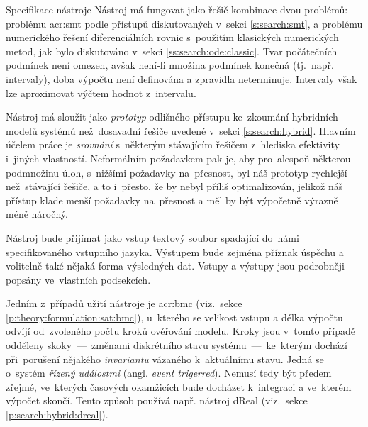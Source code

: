 \documentclass[thesis=M,czech]{FITthesis}[2012/06/26]
\newcommand{\acrlabel}[1]{acr:#1}
\newcommand{\acr}[1]{\acrshort{\acrlabel{#1}}}
\newcommand{\hl}[1]{\textit{#1}}
\newcommand{\name}[1]{\hl{#1}}
\newcommand{\rf}[1]{\ref{#1}}
\begin{document}

\begin{section}{Specifikace nástroje}\label{s:design:spec}
Nástroj má fungovat jako řešič kombinace
dvou problémů: problému \acr{smt}
podle přístupů diskutovaných v~sekci \rf{s:search:smt},
a problému numerického řešení diferenciálních rovnic
s~použitím klasických numerických metod,
jak bylo diskutováno v~sekci \rf{ss:search:ode:classic}.
Tvar počátečních podmínek není omezen,
avšak není-li množina podmínek konečná
(tj.~např. intervaly),
doba výpočtu není definována a zpravidla neterminuje.
Intervaly však lze aproximovat výčtem hodnot z~intervalu.

Nástroj má sloužit jako \hl{prototyp}
odlišného přístupu ke~zkoumání hybridních modelů systémů
než~dosavadní řešiče
uvedené v~sekci \rf{s:search:hybrid}.
Hlavním účelem práce je \hl{srovnání}
s~některým stávajícím řešičem
z~hlediska efektivity
i~jiných vlastností.
Neformálním požadavkem pak je,
aby pro~alespoň některou podmnožinu
úloh, s~nižšími požadavky na~přesnost, byl náš prototyp
rychlejší než~stávající řešiče,
a to i~přesto, že by nebyl příliš optimalizován,
jelikož náš přístup
klade menší požadavky na~přesnost
a měl by být výpočetně výrazně méně náročný.

Nástroj bude přijímat jako vstup textový soubor
spadající do~námi specifikovaného vstupního jazyka.
Výstupem bude zejména příznak úspěchu
a volitelně také nějaká forma výsledných dat.
Vstupy a výstupy jsou podrobněji popsány ve~vlastních podsekcích.

Jedním z~případů užití nástroje je \acr{bmc}
(viz.~sekce \rf{p:theory:formulation:sat:bmc}),
u~kterého se velikost vstupu a délka výpočtu
odvíjí od~zvoleného počtu kroků ověřování modelu.
Kroky jsou v~tomto případě odděleny
skoky~---~změnami diskrétního stavu
systému~---~ke~kterým dochází při~porušení
nějakého \name{invariantu} vázaného k~aktuálnímu stavu.
Jedná se o~systém \name{řízený událostmi}
(angl. \name{event trigerred}).
Nemusí tedy být předem zřejmé,
ve~kterých časových okamžicích bude docházet k~integraci
a ve~kterém výpočet skončí.
Tento způsob používá např. nástroj dReal
(viz.~sekce \rf{p:search:hybrid:dreal}).


\end{section}
\end{document}
